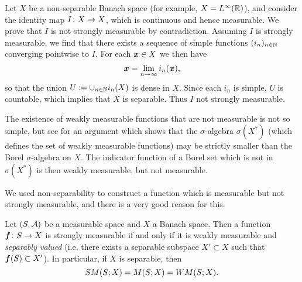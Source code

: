 \begin{example}\label{eg:non-sm}
  Let $X$ be a non-separable Banach space (for example, $X = L^\infty(\mathbb{R})$), and consider the identity map $I \colon X \rightarrow X$, which is continuous and hence measurable.
  We prove that $I$ is not strongly measurable by contradiction.
  Assuming $I$ is strongly measurable, we find that there exists a sequence of simple functions $(i_n)_{n \in \mathbb{N}}$ converging pointwise to $I$.
  For each $\bm{x} \in X$ we then have
  \begin{equation*}
    \bm{x} = \lim_{n \to \infty} i_n(\bm{x}),
  \end{equation*}
  so that the union $U := \cup_{n \in \mathbb{N}} i_n(X)$ is dense in $X$.
  Since each $i_n$ is simple, $U$ is countable, which implies that $X$ is separable.
  Thus $I$ not strongly measurable.
\end{example}

\begin{rmk}
  The existence of weakly measurable functions that are not measurable is not so simple, but see \cite[Example 1.4.3]{HNVW16} for an argument which shows that the $\sigma$-algebra $\sigma(X^*)$ (which defines the set of weakly measurable functions) may be strictly smaller than the Borel $\sigma$-algebra on $X$.
  The indicator function of a Borel set which is not in $\sigma(X^*)$ is then weakly measurable, but not measurable.
\end{rmk}

We used non-separability to construct a function which is measurable but not strongly measurable, and there is a very good reason for this.

\begin{thm}\label{thm:Pettis-measurability}
  Let $(S,\mathcal{A})$ be a measurable space and $X$ a Banach space.
  Then a function $\bm{f} \colon S \rightarrow X$ is strongly measurable if and only if it is weakly measurable and \emph{separably valued} (i.e. there exists a separable subspace $X' \subset X$ such that $\bm{f}(S) \subset X'$).
  In particular, if $X$ is separable, then
  \begin{equation*}
    SM(S;X) = M(S;X) = WM(S;X).
  \end{equation*}
\end{thm}

